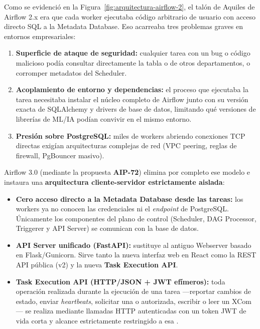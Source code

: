 Como se evidenció en la Figura~\ref{fig:arquitectura-airflow-2}, el talón de Aquiles de Airflow 2.x era que cada worker ejecutaba código arbitrario de usuario con acceso directo SQL a la Metadata Database. Eso acarreaba tres problemas graves en entornos empresariales:
\begin{enumerate}
  \item \textbf{Superficie de ataque de seguridad:} cualquier tarea con un bug o código malicioso podía consultar directamente la tabla  o  de otros departamentos, o corromper metadatos del Scheduler.
  \item \textbf{Acoplamiento de entorno y dependencias:} el proceso que ejecutaba la tarea necesitaba instalar el núcleo completo de Airflow junto con su versión exacta de SQLAlchemy y drivers de base de datos, limitando qué versiones de librerías de ML/IA podían convivir en el mismo entorno.
  \item \textbf{Presión sobre PostgreSQL:} miles de workers abriendo conexiones TCP directas exigían arquitecturas complejas de red (VPC peering, reglas de firewall, PgBouncer masivo).
\end{enumerate}

Airflow 3.0 (mediante la propuesta \textbf{AIP-72}) elimina por completo ese modelo e instaura una \textbf{arquitectura cliente-servidor estrictamente aislada}:
\begin{itemize}
  \item \textbf{Cero acceso directo a la Metadata Database desde las tareas:} los workers ya no conocen las credenciales ni el \textit{endpoint} de PostgreSQL. Únicamente los componentes del plano de control (Scheduler, DAG Processor, Triggerer y API Server) se comunican con la base de datos.
  \item \textbf{API Server unificado (FastAPI):} sustituye al antiguo Webserver basado en Flask/Gunicorn. Sirve tanto la nueva interfaz web en React como la REST API pública (v2) y la nueva \textbf{Task Execution API}.
  \item \textbf{Task Execution API (HTTP/JSON + JWT efímeros):} toda operación realizada durante la ejecución de una tarea ---reportar cambios de estado, enviar \textit{heartbeats}, solicitar una  o  autorizada, escribir o leer un XCom--- se realiza mediante llamadas HTTP autenticadas con un token JWT de vida corta y alcance estrictamente restringido a esa .
\end{itemize}

